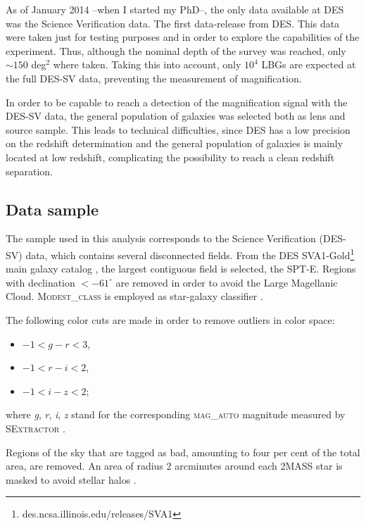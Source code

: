 As of January 2014 --when I started my PhD--, the only data available at DES was the Science Verification data. The first data-release from DES. This data were taken just for testing purposes and in order to explore the capabilities of the experiment. Thus, although the nominal depth of the survey was reached, only $\sim 150$ deg$^2$ where taken. Taking this into account, only $10^4$ LBGs are expected at the full DES-SV data, preventing the measurement of magnification.
\newline

In order to be capable to reach a detection of the magnification signal with the DES-SV data, the general population of galaxies was selected both as lens and source sample. This leads to technical difficulties, since DES has a low precision on the redshift determination and the general population of galaxies is mainly located at low redshift, complicating the possibility to reach a clean redshift separation. 

\subsection{Data sample}
\label{sec:data_sample_SV}
The sample used in this analysis corresponds to the Science Verification (DES-SV) data, which contains several disconnected fields. From the DES SVA1-Gold\footnote{des.ncsa.illinois.edu/releases/SVA1} main galaxy catalog \cite{2016MNRAS.455.4301C}, the largest contiguous field is selected, the SPT-E. Regions with declination $ < -61^{\circ}$ are removed in order to avoid the Large Magellanic Cloud. {\scshape Modest\_class} is employed as star-galaxy classifier \cite{0004-637X-801-2-73}.
\newline

The following color cuts are made in order to remove outliers in color space:
\begin{itemize}
	\item $-1 < g-r < 3$,
	\item $-1 < r-i < 2$,
	\item $-1 < i-z < 2$;
\end{itemize}
where {\it g}, {\it r}, {\it i}, {\it z} stand for the corresponding {\scshape mag\_auto} magnitude measured by {\scshape SExtractor} \cite{1996A&AS..117..393B}.
\newline

Regions of the sky that are tagged as bad, amounting to four per cent of the total area, are removed. An area of radius 2 arcminutes around each 2MASS star is masked to avoid stellar halos \cite{2005MNRAS.361.1287M,0004-637X-633-2-589}.
\newline

